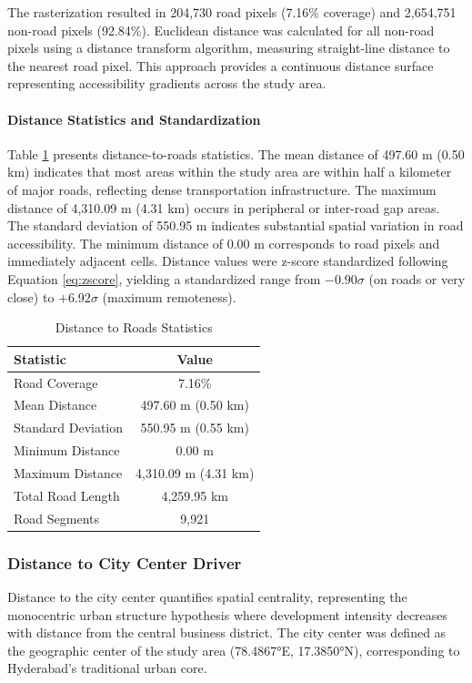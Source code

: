 \documentclass[12pt,a4paper]{article}
\begin{document}
The rasterization resulted in 204,730 road pixels (7.16\% coverage) and 2,654,751 non-road pixels (92.84\%). Euclidean distance was calculated for all non-road pixels using a distance transform algorithm, measuring straight-line distance to the nearest road pixel. This approach provides a continuous distance surface representing accessibility gradients across the study area.

\paragraph{Distance Statistics and Standardization}
Table \ref{tab:distance_roads_stats} presents distance-to-roads statistics. The mean distance of 497.60 m (0.50 km) indicates that most areas within the study area are within half a kilometer of major roads, reflecting dense transportation infrastructure. The maximum distance of 4,310.09 m (4.31 km) occurs in peripheral or inter-road gap areas. The standard deviation of 550.95 m indicates substantial spatial variation in road accessibility. The minimum distance of 0.00 m corresponds to road pixels and immediately adjacent cells. Distance values were z-score standardized following Equation \ref{eq:zscore}, yielding a standardized range from $-0.90\sigma$ (on roads or very close) to $+6.92\sigma$ (maximum remoteness).

\begin{table}[H]
\caption{Distance to Roads Statistics}
\label{tab:distance_roads_stats}
\centering
\small
\begin{tabular}{lc}
\toprule
\textbf{Statistic} & \textbf{Value} \\
\midrule
Road Coverage & 7.16\% \\
Mean Distance & 497.60 m (0.50 km) \\
Standard Deviation & 550.95 m (0.55 km) \\
Minimum Distance & 0.00 m \\
Maximum Distance & 4,310.09 m (4.31 km) \\
Total Road Length & 4,259.95 km \\
Road Segments & 9,921 \\
\bottomrule
\end{tabular}
\end{table}
\subsubsection{Distance to City Center Driver}

Distance to the city center quantifies spatial centrality, representing the monocentric urban structure hypothesis where development intensity decreases with distance from the central business district. The city center was defined as the geographic center of the study area (78.4867°E, 17.3850°N), corresponding to Hyderabad's traditional urban core.
\end{document}
